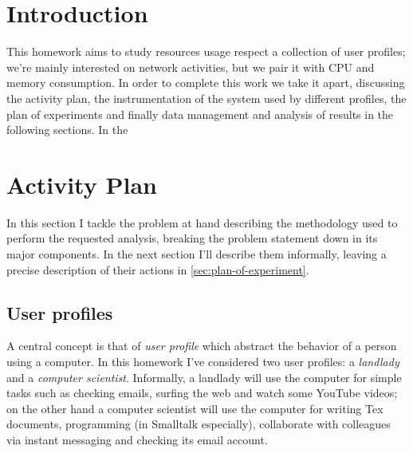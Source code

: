 \documentclass[10pt,a4paper]{article}
\begin{document}
    \title{\rmfamily\normalfont{}}
    \author{} \date{\today}
    
    \maketitle

    \begin{abstract}
      This short article collects the work I did in order to support
      my Quantitative Systems Analysis exam. The goal is to study
      resources usage respect a collection of user profiles, each of
      them catch a way of using some applications of interest in
      different time windows. I performed some experiments collecting
      results in a OLAP ``star''-like relational schema in order to
      provide summaries for dimensions under study, such as bandwidth
      usage, network activity, CPU and memory consumption.
    \end{abstract}
       
    \tableofcontents
   
    \section*{Introduction}

    This homework aims to study resources usage respect a collection
    of user profiles; we're mainly interested on network activities,
    but we pair it with CPU and memory consumption. In order to
    complete this work we take it apart, discussing the activity plan,
    the instrumentation of the system used by different profiles, the
    plan of experiments and finally data management and analysis of
    results in the following sections. In the 
 
    \newpage
    \section{Activity Plan}
    In this section I tackle the problem at hand describing the
    methodology used to perform the requested analysis, breaking the
    problem statement down in its major components. In the next
    section I'll describe them informally, leaving a precise
    description of their actions in \autoref{sec:plan-of-experiment}.


    \subsection{User profiles}
    A central concept is that of \emph{user profile} which abstract
    the behavior of a person using a computer. In this homework I've
    considered two user profiles: a \emph{landlady} and a
    \emph{computer scientist}. Informally, a landlady will use the
    computer for simple tasks such as checking emails, surfing the web
    and watch some YouTube videos; on the other hand a computer
    scientist will use the computer for writing Tex documents,
    programming (in Smalltalk especially), collaborate with colleagues
    via instant messaging and checking its email account.
\end{document}
